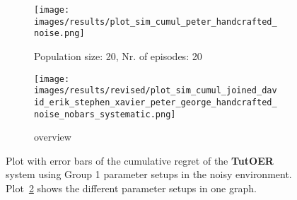 \begin{figure}[ht]
\begin{subfigure}{0.48\linewidth}
	\texttt{[image: images/results/plot\_sim\_cumul\_peter\_handcrafted\_noise.png]}
	\caption{Population size: 20, Nr. of episodes: 20}
	\label{fig:cumul_handcrafted_noise_peter}
	\end{subfigure}
	\begin{subfigure}{\linewidth}
	\texttt{[image: images/results/revised/plot\_sim\_cumul\_joined\_david\_erik\_stephen\_xavier\_peter\_george\_handcrafted\_noise\_nobars\_systematic.png]}
	\caption{overview}
	\label{fig:cumul_handcrafted_noise_overview_group1}
	\end{subfigure}
	\caption[Cumulative regret in noisy simulated environment for group 1]{Plot with error bars of the cumulative regret of the \textbf{TutOER}
	system using Group 1 parameter setups in the noisy environment.
	Plot~\ref{fig:cumul_handcrafted_noise_overview_group1} shows the
	different parameter setups in one graph.}
	\label{fig:cumul_handcrafted_noise_container_group1}
\end{figure}


